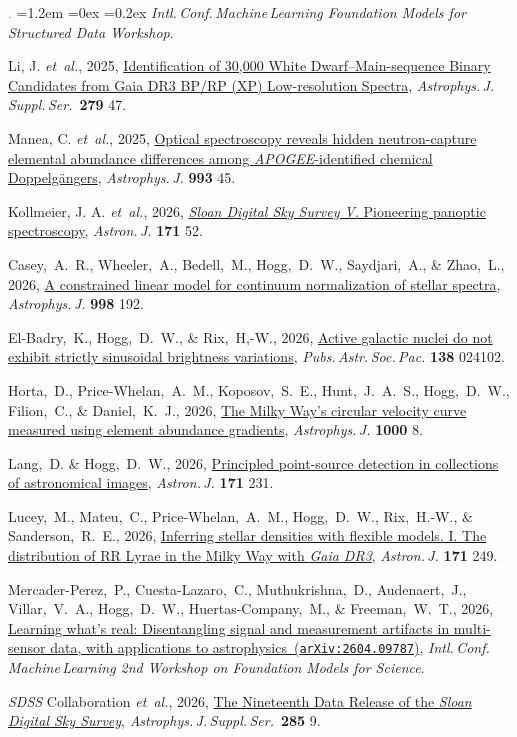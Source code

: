 \documentclass[10pt,letterpaper]{article}
\newcommand{\foreign}[1]{\textsl{#1}}
\newcommand{\etal}{\foreign{et~al.}}
\newcommand{\project}[1]{\textsl{#1}}
\newcommand{\doi}[2]{\href{http://dx.doi.org/#1}{{#2}}}
\newcommand{\arxiv}[2]{\href{http://arxiv.org/abs/#1}{{#2}\ (\texttt{arXiv:#1})}}
\newcommand{\deemph}[1]{\textcolor{grey}{\footnotesize{#1}}}
\newcommand{\pubnumber}[1]{\deemph{{#1}.}}
\newcounter{refpubnum}
\newcommand{\hogglist}{%
    \rightmargin=0in
    \leftmargin=1.2em
    \topsep=0ex
    \partopsep=0pt
    \itemsep=0.2ex
    \parsep=0pt
    \itemindent=-1.0\leftmargin
    \listparindent=0.0\leftmargin
    \settowidth{\labelsep}{~}
    \usecounter{refpubnum}
  }
\begin{document}
\begin{list}{\pubnumber{\therefpubnum}}{\hogglist}
  \textit{Intl.\,Conf.\,Machine\,Learning Foundation Models for Structured Data Workshop}.
\item Li, J. \etal, 2025,
  \doi{10.3847/1538-4365/addf3a}{Identification of 30,000 White Dwarf–Main-sequence Binary Candidates from Gaia DR3 BP/RP (XP) Low-resolution Spectra},
  \textit{Astrophys.\,J.\,Suppl.\,Ser.}\ \textbf{279} 47.
\item Manea, C. \etal, 2025,
  \doi{10.3847/1538-4357/adff75}{Optical spectroscopy reveals hidden neutron-capture elemental abundance differences among \project{APOGEE}-identified chemical Doppelg\"angers},
  \textit{Astrophys.\,J.} \textbf{993} 45.
\item Kollmeier, J. A. \etal, 2026,
  \doi{10.3847/1538-3881/ae0576}{\project{Sloan Digital Sky Survey V}. Pioneering panoptic spectroscopy},
  \textit{Astron.\,J.} \textbf{171} 52.
\item Casey,~A.~R., Wheeler,~A., Bedell,~M., Hogg,~D.~W., Saydjari,~A., \& Zhao,~L., 2026,
\doi{10.3847/1538-4357/ae3bd6}{A constrained linear model for continuum normalization of stellar spectra},
\textit{Astrophys.\,J.} \textbf{998} 192.
\item El-Badry,~K., Hogg,~D.~W., \& Rix,~H,-W., 2026,
  \doi{10.1088/1538-3873/ae3f56}{Active galactic nuclei do not exhibit strictly sinusoidal brightness variations},
  \textit{Pubs.\,Astr.\,Soc.\,Pac.} \textbf{138} 024102.
\item Horta,~D., Price-Whelan,~A.~M., Koposov,~S.~E., Hunt,~J.~A.~S., Hogg,~D.~W., Filion,~C., \& Daniel,~K.~J., 2026,
  \doi{10.3847/1538-4357/ae43de}{The Milky Way's circular velocity curve measured using element abundance gradients},
  \textit{Astrophys.\,J.} \textbf{1000} 8.
\item Lang,~D. \& Hogg,~D.~W., 2026,
  \doi{10.3847/1538-3881/ae4505}{Principled point-source detection in collections of astronomical images},
  \textit{Astron.\,J.} \textbf{171} 231.
\item Lucey,~M., Mateu,~C., Price-Whelan,~A.~M., Hogg,~D.~W., Rix,~H.-W., \& Sanderson,~R.~E., 2026,
  \doi{10.3847/1538-3881/ae4aaa}{Inferring stellar densities with flexible models. I. The distribution of RR Lyrae in the Milky Way with \project{Gaia DR3}},
  \textit{Astron.\,J.} \textbf{171} 249.
\item Mercader-Perez,~P., Cuesta-Lazaro,~C., Muthukrishna,~D., Audenaert,~J., Villar,~V.~A., Hogg,~D.~W., Huertas-Company,~M., \& Freeman,~W.~T., 2026,
  \arxiv{2604.09787}{Learning what's real: Disentangling signal and measurement artifacts in multi-sensor data, with applications to astrophysics},
  \textit{Intl.\,Conf.\,Machine\,Learning 2nd Workshop on Foundation Models for Science}.
\item \project{SDSS} Collaboration \etal, 2026,
  \doi{10.3847/1538-4365/ae4697}{The Nineteenth Data Release of the \project{Sloan Digital Sky Survey}},
  \textit{Astrophys.\,J.\,Suppl.\,Ser.}\ \textbf{285} 9.
\label{rpcount}\end{list}
\end{document}
